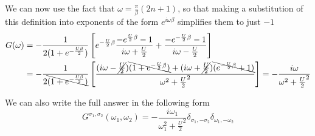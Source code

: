 We can now use the fact that $\omega = \frac{\pi}{\beta}(2n+1)$,
 so that making a substitution of this definition into exponents of the form $e^{i\omega\beta}$ simplifies them to just $-1$
\begin{equation}\begin{aligned}
 G(\omega) & = -\frac{1}{2(1+e^{-\frac{U\beta}{2}})}\left[
    e^{-\frac{U}{2}\beta} \frac{-e^{\frac{U}{2}\beta}-1}{i\omega+\frac{U}{2}} + \frac{-e^{-\frac{U}{2}\beta}-1}{i\omega-\frac{U}{2}}
  \right] \\
  & = - \frac{1}{2\bcancel{(1+e^{-\frac{U\beta}{2}})}}\left[
    \frac{(i\omega-\cancel{\frac{U}{2}})\bcancel{(1+e^{-\frac{U}{2}\beta})}+(i\omega+\cancel{\frac{U}{2}})\bcancel{(e^{-\frac{U}{2}\beta}+1)}}{\omega^2+\frac{U}{2}^2}
  \right] = -\frac{i\omega}{\omega^2+\frac{U}{2}^2}
\end{aligned}\end{equation}
 
We can also write the full answer in the following form
\begin{equation}
 G^{\sigma_1,\sigma_2}(\omega_1,\omega_2) = -\frac{i\omega_1}{\omega_1^2+\frac{U}{2}^2}\delta_{\sigma_1,-\sigma_2}\delta_{\omega_1,-\omega_2}
\end{equation}

